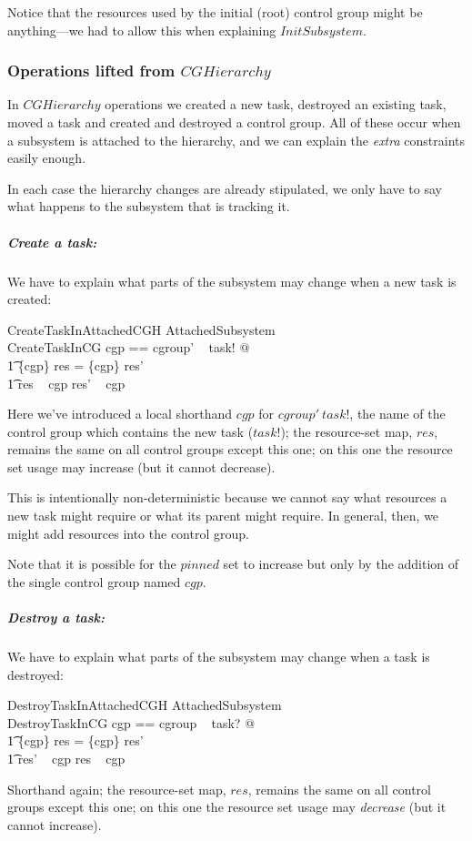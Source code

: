 \documentclass[a4paper,twoside,12pt]{article}
\begin{document}
Notice that the resources used by the initial (root) control group might be anything---we had to allow this when
explaining $InitSubsystem$.

\subsubsection{Operations lifted from $CGHierarchy$}

In $CGHierarchy$ operations we created a new task, destroyed an existing task, moved a task and created and destroyed
a control group.  All of these occur when a subsystem is attached to the hierarchy, and we can explain the \emph{extra}
constraints easily enough.

In each case the hierarchy changes are already stipulated, we only have to say what happens to the subsystem that is
tracking it.

\subparagraph{Create a task:}
We have to explain what parts of the subsystem may change when a new task is created:

\begin{schema}{CreateTaskInAttachedCGH}
\Delta AttachedSubsystem \\
CreateTaskInCG
\where
\LET cgp == cgroup' ~ task! @ \\
\t1 \{cgp\} \ndres res = \{cgp\} \ndres res' \land \\
\t1 res ~ cgp \subseteq res' ~ cgp
\end{schema}
Here we've introduced a local shorthand $cgp$ for $cgroup' ~ task!$, the name of the control group which contains
the new task ($task!$); the resource-set map, $res$, remains the same on all control groups except this one;
on this one the resource set usage may increase (but it cannot decrease).

This is intentionally non-deterministic because we cannot say what resources a new task might require or 
what its parent might require. In general, then, we might add resources into the control group.

Note that it is possible for the $pinned$ set to increase but only by the addition of the single control group 
named $cgp$.

\subparagraph{Destroy a task:}
We have to explain what parts of the subsystem may change when a task is destroyed:

\begin{schema}{DestroyTaskInAttachedCGH}
\Delta AttachedSubsystem \\
DestroyTaskInCG
\where
\LET cgp == cgroup ~ task? @ \\
\t1 \{cgp\} \ndres res = \{cgp\} \ndres res' \land \\
\t1 res' ~ cgp \subseteq res ~ cgp
\end{schema}
Shorthand again;  the resource-set map, $res$, remains the same on all control groups except this one;
on this one the resource set usage may \emph{decrease} (but it cannot increase).
\end{document}

